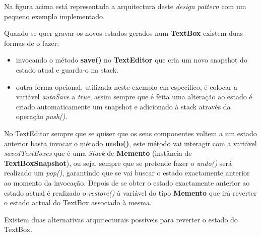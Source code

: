 \hspace{2mm} Na figura acima está representada a arquitectura deste \textit{design pattern} com um pequeno exemplo implementado. 

\hspace{2mm} Quando se quer gravar os novos estados gerados num \textbf{TextBox} existem duas formas de o fazer:
\begin{itemize}
    \item invocando o método \textbf{save()} no \textbf{TextEditor} que cria um novo snapshot do estado atual e guarda-o na stack.
    \newline
    
    \item outra forma opcional, utilizada neste exemplo em específico, é colocar a variável \textit{autoSave} a \textit{true}, assim sempre que é feita uma alteração ao estado é criado automaticamente um snapshot e adicionado à stack através da operação \textit{push()}.
    \newline
    
\end{itemize}

\hspace{2mm} No TextEditor sempre que se quiser que os seus componentes voltem a um estado anterior basta invocar o método \textbf{undo()}, este método vai interagir com a variável \textit{savedTextBoxes} que é uma \textit{Stack} de \textbf{Memento} (instância de \textbf{TextBoxSnapshot}), ou seja, sempre que se pretende fazer o \textit{undo()} será realizado um \textit{pop()}, garantindo que se vai buscar o estado exactamente anterior ao momento da invocação. Depois de se obter o estado exactamente anterior ao estado actual é realizado o \textit{restore()} à variável do tipo \textbf{Memento} que irá reverter o estado actual do TextBox associado à mesma.

\hspace{2mm} Existem duas alternativas arquitecturais possíveis para reverter o estado do TextBox. 
\newline

